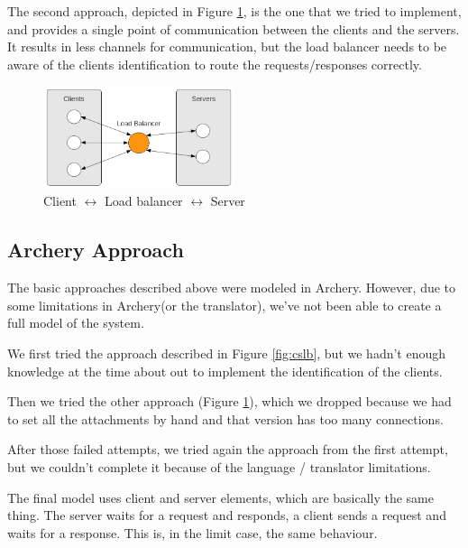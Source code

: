 \documentclass[a4paper]{article}
\newcommand{\ar}{Archery\xspace}
\begin{document}
The second approach, depicted in Figure \ref{fig:clbs}, is the one that we
tried to implement, and provides a single point of communication between the
clients and the servers. It results in less channels for communication, but the
load balancer needs to be aware of the clients identification to route the
requests/responses correctly.

\begin{figure}[htb]
	\begin{center}
		\includegraphics[width=0.5\textwidth]{images/c_lb_s.png}
	\end{center}
	\caption{Client $\leftrightarrow$ Load balancer  $\leftrightarrow$ Server }
	\label{fig:clbs}
\end{figure}


\subsection{\ar Approach}

The basic approaches described above were modeled in \ar. However, due to some
limitations in \ar (or the translator), we've not been able to create a full
model of the system.

We first tried the approach described in Figure \ref{fig:cslb}, but we hadn't
enough knowledge at the time about out to implement the identification of the
clients.

Then we tried the other approach (Figure \ref{fig:clbs}), which we dropped because we had to set all
the attachments by hand and that version has too many connections.

After those failed attempts, we tried again the approach from the first
attempt, but we couldn't complete it because of the language / translator
limitations.

The final model uses client and server elements, which are basically the same
thing. The server waits for a request and responds, a client sends a request and
waits for a response. This is, in the limit case, the same behaviour. 

\end{document}
